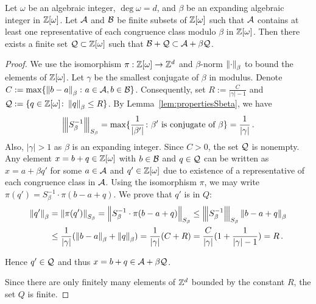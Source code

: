 \begin{lem}
\label{lem:suffCondPhase1}
    Let $\omega$ be an algebraic integer, $\deg \omega=d$, and $\beta$ be an expanding algebraic integer in $\mathbb{Z}[\omega]$. Let $\mathcal{A}$ and $\mathcal{B}$ be finite subsets of $\mathbb{Z}[\omega]$ such that $\mathcal{A}$ contains at least one representative of each congruence class modulo $\beta$ in $\mathbb{Z}[\omega]$. Then there exists a finite set $\mathcal{Q}\subset\mathbb{Z}[\omega]$  such that $ \mathcal{B} + \mathcal{Q} \subset \mathcal{A} + \beta \mathcal{Q}$.
\end{lem}

\begin{proof}
We use the isomorphism $\pi:\mathbb{Z}[\omega] \rightarrow \mathbb{Z}^{d}$ and $\beta$-norm $\left\lVert\cdot\right\rVert_{\beta}$ to bound the elements of $\mathbb{Z}[\omega]$.
Let $\gamma$ be the smallest conjugate of $\beta$ in modulus. 
 Denote $C:=\max\{\left\lVert b-a\right\rVert_{\beta}\colon a \in \mathcal{A}, b \in \mathcal{B}\}$. Consequently, set $R:=\frac{C}{|\gamma|-1}$ and $\mathcal{Q}:=\{q\in\mathbb{Z}[\omega]\colon \left\lVert q\right\rVert_{\beta}\leq R\}$. By Lemma~\ref{lem:propertiesSbeta}, we have 
 $$
 {\left\vert\kern-0.25ex\left\vert\kern-0.25ex\left\vert S_\beta^{-1}\right\vert\kern-0.25ex\right\vert\kern-0.25ex\right\vert}_{S_\beta}=\max \{\frac{1}{|\beta'|} \colon \beta' \text{ is conjugate of } \beta\}=\frac{1}{|\gamma|}\,.
 $$ 
 Also, $|\gamma|>1$ as $\beta$ is an expanding integer.  Since $C>0$, the set $\mathcal{Q}$ is nonempty. Any element $x=b+q \in \mathbb{Z}[\omega]$ with $b\in\mathcal{B}$ and $q\in\mathcal{Q}$ can be written as $x=a+\beta q'$ for some $a\in\mathcal{A}$  and $q'\in\mathbb{Z}[\omega]$ due to existence of a representative of each congruence class in $\mathcal{A}$. Using the isomorphism $\pi$, we may write $\pi(q')=S^{-1}_\beta \cdot \pi(b-a+q)$. We prove that $q'$ is in $Q$:
\begin{align*}
    \left\lVert q'\right\rVert_{\beta}&=\left\lVert\pi(q')\right\rVert_{S_\beta}=\left\lVert S^{-1}_\beta \cdot \pi(b-a+q)\right\rVert_{S_\beta}\leq {\left\vert\kern-0.25ex\left\vert\kern-0.25ex\left\vert S^{-1}_\beta\right\vert\kern-0.25ex\right\vert\kern-0.25ex\right\vert}_{S_\beta}  \left\lVert b-a+q\right\rVert_{\beta} \\
    &\leq  \frac{1}{|\gamma|} (\left\lVert b-a\right\rVert_{\beta} +\left\lVert q\right\rVert_{\beta})=\frac{1}{|\gamma|} (C+R)=\frac{C}{|\gamma|} (1+\frac{1}{|\gamma|-1}) =R\,.
\end{align*}
 
 Hence $q'\in\mathcal{Q}$ and thus  $x=b+q \in \mathcal{A} + \beta \mathcal{Q}$. 
 
 Since there are only finitely many elements of $\mathbb{Z}^{d}$ bounded by the constant $R$, the set $Q$ is finite.
\end{proof}

